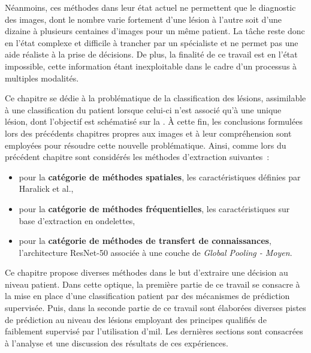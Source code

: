 Néanmoins, ces méthodes dans leur état actuel ne permettent que le diagnostic des images, dont le nombre varie fortement d'une lésion à l'autre soit d'une dizaine à plusieurs centaines d'images pour un même patient. La tâche reste donc en l'état complexe et difficile à trancher par un spécialiste et ne permet pas une aide réaliste à la prise de décisions. De plus, la finalité de ce travail est en l'état impossible, cette information étant inexploitable dans le cadre d'un processus à multiples modalités.\par

Ce chapitre se dédie à la problématique de la classification des lésions, assimilable à une classification du patient lorsque celui-ci n'est associé qu'à une unique lésion, dont l'objectif est schématisé sur la . À cette fin, les conclusions formulées lors des précédents chapitres propres aux images et à leur compréhension sont employées pour résoudre cette nouvelle problématique. Ainsi, comme lors du précédent chapitre sont considérés les méthodes d'extraction suivantes~:
\begin{itemize}
    \item pour la \textbf{catégorie de méthodes spatiales}, les caractéristiques définies par Haralick et al.\cite{Haralick1973},
    \item pour la \textbf{catégorie de méthodes fréquentielles}, les caractéristiques sur base d'extraction en ondelettes,
    \item pour la \textbf{catégorie de méthodes de transfert de connaissances}, l'architecture ResNet-50 associée à une couche de \textit{Global Pooling - Moyen}.
\end{itemize}\par\par

Ce chapitre propose diverses méthodes dans le but d'extraire une décision au niveau patient. Dans cette optique, la première partie de ce travail se consacre à la mise en place d'une classification patient par des mécanismes de prédiction supervisée. Puis, dans la seconde partie de ce travail sont élaborées diverses pistes de prédiction au niveau des lésions employant des principes qualifiés de faiblement supervisé par l'utilisation d'\gls{mil}. Les dernières sections sont consacrées à l'analyse et une discussion des résultats de ces expériences.\par


